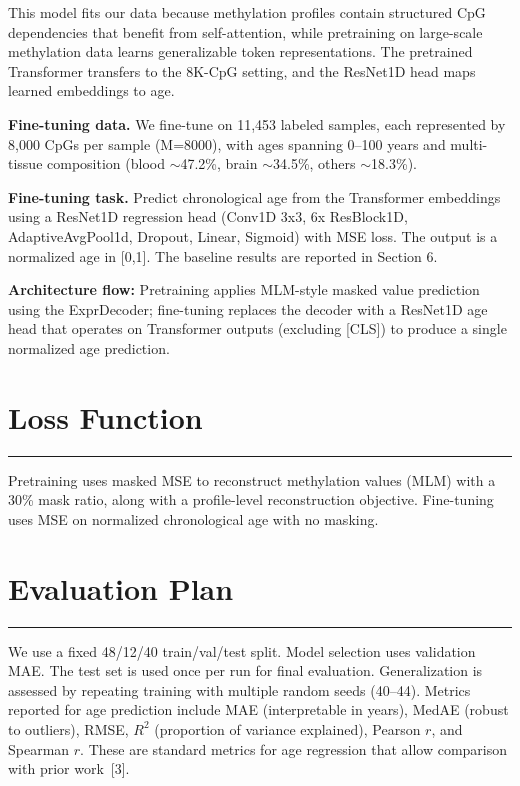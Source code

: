 \documentclass[11pt]{article}
\begin{document}
\noindent This model fits our data because methylation profiles contain structured CpG dependencies that benefit from self-attention, while pretraining on large-scale methylation data learns generalizable token representations. The pretrained Transformer transfers to the 8K-CpG setting, and the ResNet1D head maps learned embeddings to age.

\noindent \textbf{Fine-tuning data.} We fine-tune on 11,453 labeled samples, each represented by 8,000 CpGs per sample (M=8000), with ages spanning 0--100 years and multi-tissue composition (blood $\sim$47.2\%, brain $\sim$34.5\%, others $\sim$18.3\%).

\noindent \textbf{Fine-tuning task.} Predict chronological age from the Transformer embeddings using a ResNet1D regression head (Conv1D 3x3, 6x ResBlock1D, AdaptiveAvgPool1d, Dropout, Linear, Sigmoid) with MSE loss. The output is a normalized age in [0,1]. The baseline results are reported in Section 6.

\noindent \textbf{Architecture flow:} Pretraining applies MLM-style masked value prediction using the ExprDecoder; fine-tuning replaces the decoder with a ResNet1D age head that operates on Transformer outputs (excluding [CLS]) to produce a single normalized age prediction.

\section{Loss Function}
\vspace{-0.3em}
\hrule
\vspace{0.8em}
Pretraining uses masked MSE to reconstruct methylation values (MLM) with a 30\% mask ratio, along with a profile-level reconstruction objective. Fine-tuning uses MSE on normalized chronological age with no masking.

\section{Evaluation Plan}
\vspace{-0.3em}
\hrule
\vspace{0.8em}
We use a fixed 48/12/40 train/val/test split. Model selection uses validation MAE. The test set is used once per run for final evaluation. Generalization is assessed by repeating training with multiple random seeds (40--44). Metrics reported for age prediction include MAE (interpretable in years), MedAE (robust to outliers), RMSE, $R^2$ (proportion of variance explained), Pearson $r$, and Spearman $r$. These are standard metrics for age regression that allow comparison with prior work~[3].
\end{document}
